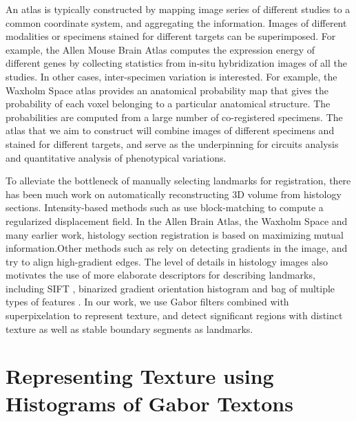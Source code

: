 \documentclass{llncs}
\begin{document}
An atlas is typically constructed by mapping image series of different studies to a common coordinate system, and aggregating the information. 
Images of different modalities or specimens stained for different targets can be superimposed. For example, the Allen Mouse Brain Atlas\cite{lein2007genome} computes the expression energy of different genes by collecting statistics from in-situ hybridization images of all the studies. 
In other cases, inter-specimen variation is interested. For example, the Waxholm Space atlas\cite{lee2005standard} provides an anatomical probability map that gives the probability of each voxel belonging to a particular anatomical structure. The probabilities are computed from a large number of co-registered specimens. The atlas that we aim to construct will combine images of different specimens and stained for different targets, and serve as the underpinning for circuits analysis and quantitative analysis of phenotypical variations.

To alleviate the bottleneck of manually selecting landmarks for registration, there has been much work on automatically reconstructing 3D volume from histology sections. Intensity-based methods such as \cite{ourselin2001reconstructing, roberts2012toward} use block-matching to compute a regularized displacement field. In the Allen Brain Atlas\cite{lein2007genome, yushkevich20063d}, the Waxholm Space \cite{johnson2010waxholm} and many earlier work\cite{lee2005standard, ali2005automated}, histology section registration is based on maximizing mutual information.Other methods such as \cite{cifor2011smoothness, bagci2010automatic, haber2006intensity} rely on detecting gradients in the image, and try to align high-gradient edges. The level of details in histology images also motivates the use of more elaborate descriptors for describing landmarks, including SIFT \cite{sun2012nearly}, binarized gradient orientation histogram \cite{kurkure2011landmark} and bag of multiple types of features \cite{cruz2011visual}. In our work, we use Gabor filters combined with superpixelation to represent texture, and detect significant regions with distinct texture as well as stable boundary segments as landmarks.

\section{Representing Texture using Histograms of Gabor Textons} 

%
%
%
\end{document}
